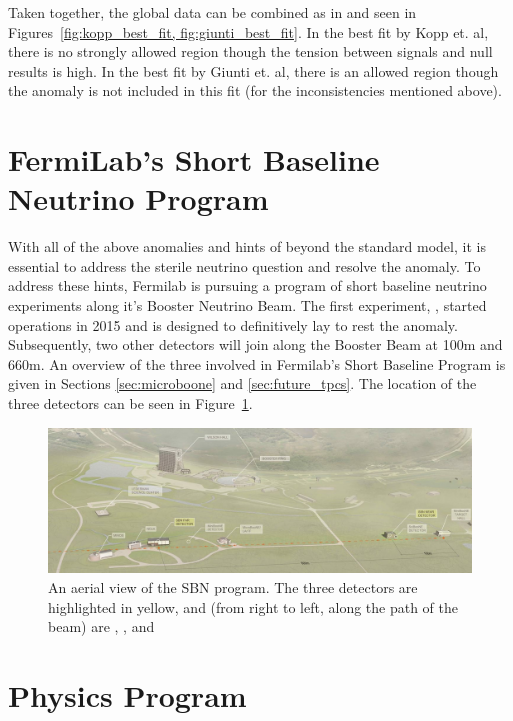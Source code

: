Taken together, the global data can be combined as in \cite{kopp_best_fit,giunti_best_fit} and seen in Figures~\ref{fig:kopp_best_fit, fig:giunti_best_fit}.  In the best fit by Kopp et. al, there is no strongly allowed region though the tension between signals and null results is high.  In the best fit by Giunti et. al, there is an allowed region though the \MB anomaly is not included in this fit (for the inconsistencies mentioned above).


\section{FermiLab's Short Baseline Neutrino Program}

\label{sec:sbn_detectors}
With all of the above anomalies and hints of beyond the standard model, it is essential to address the sterile neutrino question and resolve the \MB anomaly.  To address these hints, Fermilab is pursuing a program of short baseline neutrino experiments along it's Booster Neutrino Beam.  The first experiment, \uboone, started operations in 2015 and is designed to definitively lay to rest the \MB anomaly.  Subsequently, two other detectors will join \uboone along the Booster Beam at 100m and 660m.  An overview of the three \lartpcs involved in Fermilab's Short Baseline Program is given in Sections \ref{sec:microboone} and \ref{sec:future_tpcs}.  The location of the three detectors can be seen in Figure~\ref{fig:sbn_birdseyeview}.

\begin{figure}[tb]
  \centering
  \includegraphics[width=\textwidth]{sbn_figures/SBN_Map.jpeg}
  \caption[SBN Detector Locations]{An aerial view of the SBN program.  The three detectors are highlighted in yellow, and (from right to left, along the path of the beam) are \sbnd, \uboone, and \icarus}
  \label{fig:sbn_birdseyeview}
\end{figure}

\section{Physics Program}

